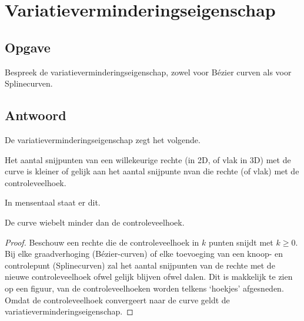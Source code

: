 \documentclass[examenvragen.tex]{subfiles}
\begin{document}
\section{Variatieverminderingseigenschap}
\subsection{Opgave}
Bespreek de variatieverminderingseigenschap, zowel voor B\'ezier curven als voor Splinecurven.

\subsection{Antwoord}
De variatieverminderingseigenschap zegt het volgende.
\begin{center}
Het aantal snijpunten van een willekeurige rechte (in 2D, of vlak in 3D) met de curve is kleiner of gelijk aan het aantal snijpunte nvan die rechte (of vlak) met de controleveelhoek. 
\end{center}
In mensentaal staat er dit.
\begin{center}
De curve wiebelt minder dan de controleveelhoek.
\end{center}
\begin{proof}
Beschouw een rechte die de controleveelhoek in $k$ punten snijdt met $k\ge 0$. Bij elke graadverhoging (B\'ezier-curven) of elke toevoeging van een knoop- en controlepunt (Splinecurven) zal het aantal snijpunten van de rechte met de nieuwe controleveelhoek ofwel gelijk blijven ofwel dalen. Dit is makkelijk te zien op een figuur, van de controleveelhoeken worden telkens `hoekjes' afgesneden. Omdat de controleveelhoek convergeert naar de curve geldt de variatieverminderingseigenschap.
\end{proof}
\end{document}
